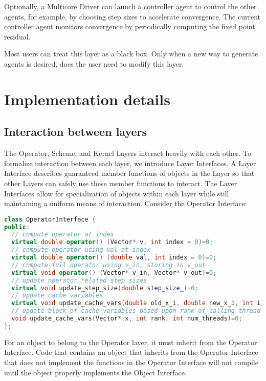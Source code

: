 Optionally, a Multicore Driver can launch a controller agent to control the other agents, for example, by choosing step sizes to accelerate convergence.
The current controller agent monitors convergence by periodically computing the fixed point residual.

Most users can treat this layer as a black box. Only when a new way to generate agents is desired, does the user need to modify this layer.

\section{Implementation details}\label{sc:implement}

\subsection{Interaction between layers} \label{sc:interface}

The Operator, Scheme, and Kernel Layers interact heavily with each other. To formalize interaction between each layer, we introduce Layer Interfaces. A Layer Interface describes guaranteed member functions of objects in the Layer so that other Layers can safely use these member functions to interact. The Layer Interfaces allow for specialization of objects within each layer while still maintaining a uniform means of interaction. Consider the Operator Interface:
\begin{lstlisting}[language=C++,label={Operator_Interface}]
class OperatorInterface {
public:
  // compute operator at index
  virtual double operator() (Vector* v, int index = 0)=0;
  // compute operator using val at index
  virtual double operator() (double val, int index = 0)=0;
  // compute full operator using v_in, storing in v_out
  virtual void operator() (Vector* v_in, Vector* v_out)=0;
  // update operator related step sizes
  virtual void update_step_size(double step_size_)=0;
  // update cache variables
  virtual void update_cache_vars(double old_x_i, double new_x_i, int i)=0;
  // update block of cache variables based upon rank of calling thread
  void update_cache_vars(Vector* x, int rank, int num_threads)=0;
};
\end{lstlisting}

For an object to belong to the Operator layer, it must inherit from the Operator Interface.
Code that contains an object that inherits from the Operator Interface that does not implement the functions in the Operator Interface will not compile until the object properly implements the Object Interface.

